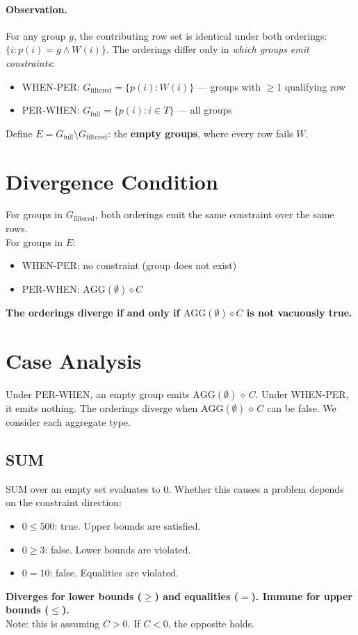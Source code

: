 \documentclass[11pt]{article}
\begin{document}
\paragraph{Observation.} For any group $g$, the contributing row set is
identical under both orderings: $\{i : p(i) = g \wedge W(i)\}$. The orderings
differ only in \emph{which groups emit constraints}:
\begin{itemize}
    \item WHEN-PER: $G_{\text{filtered}} = \{p(i) : W(i)\}$ --- groups with $\geq 1$ qualifying row
    \item PER-WHEN: $G_{\text{full}} = \{p(i) : i \in T\}$ --- all groups
\end{itemize}
Define $E = G_{\text{full}} \setminus G_{\text{filtered}}$: the
\textbf{empty groups}, where every row fails $W$.

\section{Divergence Condition}

For groups in $G_{\text{filtered}}$, both orderings emit the same constraint over the same rows.\\
For groups in $E$:
\begin{itemize}
    \item WHEN-PER: no constraint (group does not exist)
    \item PER-WHEN: $\text{AGG}(\emptyset) \diamond C$
\end{itemize}
\textbf{The orderings diverge if and only if $\text{AGG}(\emptyset) \diamond C$
is not vacuously true.}

\section{Case Analysis}

Under PER-WHEN, an empty group emits $\text{AGG}(\emptyset) \, \diamond \, C$.
Under WHEN-PER, it emits nothing. The orderings diverge when
$\text{AGG}(\emptyset) \, \diamond \, C$ can be false. We consider each
aggregate type.

\subsection*{SUM}

SUM over an empty set evaluates to $0$. Whether this causes a problem
depends on the constraint direction:

\begin{itemize}[leftmargin=2em]
    \item $0 \leq 500$: true. Upper bounds are satisfied.
    \item $0 \geq 3$: false. Lower bounds are violated.
    \item $0 = 10$: false. Equalities are violated.
\end{itemize}
\textbf{Diverges for lower bounds ($\geq$) and equalities ($=$). Immune for
upper bounds ($\leq$).}\\
Note: this is assuming $C>0$. If $C<0$, the opposite holds.
\end{document}
